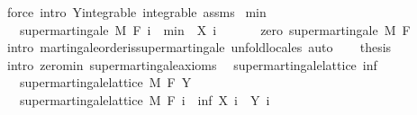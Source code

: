 \begin{isabellebody}
\ {\isacharparenleft}{\kern0pt}force\ intro{\isacharcolon}{\kern0pt}\ Y{\isachardot}{\kern0pt}integrable\ integrable\ assms{\isacharparenright}{\kern0pt}{\isacharplus}{\kern0pt}\isanewline
{}\isamarkupfalse%
%
\endisatagproof
{\isafoldproof}%
%
\isadelimproof
\isanewline
%
\endisadelimproof
\isanewline
{}\isamarkupfalse%
\ min{\isacharunderscore}{\kern0pt}{}{\isacharcolon}{\kern0pt}\isanewline
\ \ \ {\isachardoublequoteopen}supermartingale\ M\ F\ {\isacharparenleft}{\kern0pt}{\isasymlambda}i\ {\isasymxi}{\isachardot}{\kern0pt}\ min\ {}\ {\isacharparenleft}{\kern0pt}X\ i\ {\isasymxi}{\isacharparenright}{\kern0pt}{\isacharparenright}{\kern0pt}{\isachardoublequoteclose}\isanewline
%
\isadelimproof
%
\endisadelimproof
%
\isatagproof
{}\isamarkupfalse%
\ {\isacharminus}{\kern0pt}\isanewline
\ \ \isamarkupfalse%
\ zero{\isacharcolon}{\kern0pt}\ supermartingale\ M\ F\ {\isachardoublequoteopen}{\isasymlambda}{\isacharunderscore}{\kern0pt}\ {\isacharunderscore}{\kern0pt}{\isachardot}{\kern0pt}\ {}{\isachardoublequoteclose}\ \isamarkupfalse%
\ {\isacharparenleft}{\kern0pt}intro\ martingale{\isacharunderscore}{\kern0pt}order{\isachardot}{\kern0pt}is{\isacharunderscore}{\kern0pt}supermartingale{\isacharcomma}{\kern0pt}\ unfold{\isacharunderscore}{\kern0pt}locales{\isacharcomma}{\kern0pt}\ auto{\isacharparenright}{\kern0pt}\isanewline
\ \ \isamarkupfalse%
\ {\isacharquery}{\kern0pt}thesis\ \isamarkupfalse%
\ {\isacharparenleft}{\kern0pt}intro\ zero{\isachardot}{\kern0pt}min\ supermartingale{\isacharunderscore}{\kern0pt}axioms{\isacharparenright}{\kern0pt}\isanewline
{}\isamarkupfalse%
%
\endisatagproof
{\isafoldproof}%
%
\isadelimproof
\isanewline
%
\endisadelimproof
\isanewline
{}\isamarkupfalse%
\isanewline
\isanewline
{}\isamarkupfalse%
\ {\isacharparenleft}{\kern0pt}\ supermartingale{\isacharunderscore}{\kern0pt}lattice{\isacharparenright}{\kern0pt}\ inf{\isacharcolon}{\kern0pt}\isanewline
\ \ \ {\isachardoublequoteopen}supermartingale{\isacharunderscore}{\kern0pt}lattice\ M\ F\ Y{\isachardoublequoteclose}\isanewline
\ \ \ {\isachardoublequoteopen}supermartingale{\isacharunderscore}{\kern0pt}lattice\ M\ F\ {\isacharparenleft}{\kern0pt}{\isasymlambda}i\ {\isasymxi}{\isachardot}{\kern0pt}\ inf\ {\isacharparenleft}{\kern0pt}X\ i\ {\isasymxi}{\isacharparenright}{\kern0pt}\ {\isacharparenleft}{\kern0pt}Y\ i\ {\isasymxi}{\isacharparenright}{\kern0pt}{\isacharparenright}{\kern0pt}{\isachardoublequoteclose}\isanewline

\end{isabellebody}
